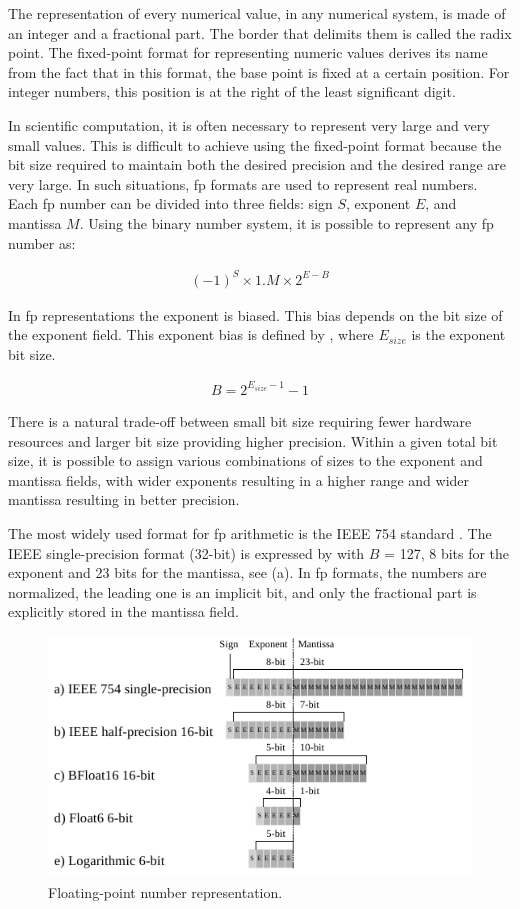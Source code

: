 The representation of every numerical value, in any numerical system, is made of an integer and a fractional part. The border that delimits them is called the radix point. The fixed-point format for representing numeric values derives its name from the fact that in this format, the base point is fixed at a certain position. For integer numbers, this position is at the right of the least significant digit.

In scientific computation, it is often necessary to represent very large and very small values. This is difficult to achieve using the fixed-point format because the bit size required to maintain both the desired precision and the desired range are very large. In such situations, \gls{fp} formats are used to represent real numbers. Each \gls{fp} number can be divided into three fields: sign $S$, exponent $E$, and mantissa $M$. Using the binary number system, it is possible to represent any \gls{fp} number as:

\begin{eqnarray} \label{eq:float}
(-1)^{S} \times 1.M \times 2^{E-B}
\end{eqnarray}

In \gls{fp} representations the exponent is biased. This bias depends on the bit size of the exponent field. This exponent bias is defined by , where $E_{size}$ is the exponent bit size.

\begin{eqnarray} \label{eq:float_bias}
B=2^{E_{size}-1}-1
\end{eqnarray}

There is a natural trade-off between small bit size requiring fewer hardware resources and larger bit size providing higher precision. Within a given total bit size, it is possible to assign various combinations of sizes to the exponent and mantissa fields, with wider exponents resulting in a higher range and wider mantissa resulting in better precision.

The most widely used format for \gls{fp} arithmetic is the IEEE 754 standard \cite{zuras2008ieee}. The IEEE single-precision format (32-bit) is expressed by  with $B$ = 127, 8 bits for the exponent and 23 bits for the mantissa, see (a). In \gls{fp} formats, the numbers are normalized, the leading one is an implicit bit, and only the fractional part is explicitly stored in the mantissa field.

\begin{figure}
	\centering
	\includegraphics[width=0.5\columnwidth]{./chapters/cnn_accelerator/figures/power_breakdown/floating_point.pdf}
	\caption{Floating-point number representation.}
	\label{fig:floating}
\end{figure}


